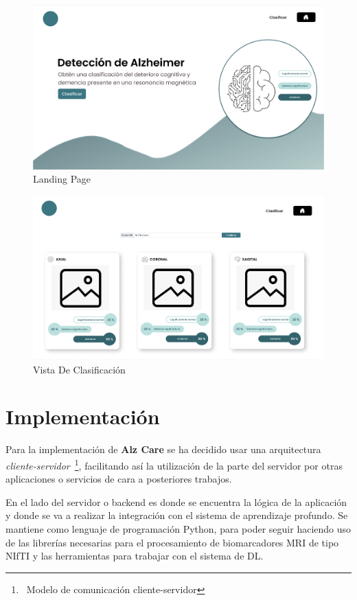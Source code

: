 \begin{figure}[H]
    \centering
    \includegraphics[width=\textwidth]{./imgs/app/landing-page}
    \caption{Landing Page}
    \label{fig:landing-page}
\end{figure}

\begin{figure}[H]
    \centering
    \includegraphics[width=\textwidth]{./imgs/app/vista-clasificacion}
    \caption{Vista De Clasificación}
    \label{fig:vista-clasificacion}
\end{figure}

\section{Implementación}\label{sec:implementacion}
Para la implementación de \textbf{Alz Care} se ha decidido usar una arquitectura
\textit{cliente-servidor}~\footnote{~\cite{cliente-servidor}{Modelo de comunicación  cliente-servidor}}, facilitando
así la utilización de la parte del servidor por otras aplicaciones o servicios de cara a posteriores trabajos.

En el lado del servidor o backend es donde se encuentra la lógica de la aplicación y donde se va a realizar la
integración con el sistema de aprendizaje profundo.
Se mantiene como lenguaje de programación Python, para poder seguir haciendo uso de las librerías necesarias para el
procesamiento de biomarcadores MRI de tipo NIfTI y las herramientas para trabajar con el sistema de DL.


